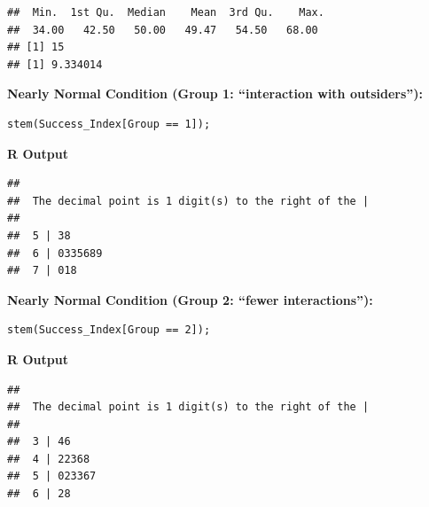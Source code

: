 \begin{example}
\begin{tcolorbox}[colback=gray!10, colframe=black!45, arc=2mm,
  before skip=4pt, after skip=4pt]
\begin{verbatim}
##  Min.  1st Qu.  Median    Mean  3rd Qu.    Max. 
##  34.00   42.50   50.00   49.47   54.50   68.00 
## [1] 15
## [1] 9.334014
\end{verbatim}
\end{tcolorbox}

\vspace{0.5em}
\noindent\textbf{Nearly Normal Condition (Group 1: “interaction with outsiders”):}
\begin{tcolorbox}[colback=gray!10, colframe=black!45, arc=2mm,
  before skip=4pt, after skip=4pt]
\begin{verbatim}
stem(Success_Index[Group == 1]);
\end{verbatim}
\end{tcolorbox}

\noindent\textbf{R Output}
\begin{tcolorbox}[colback=gray!10, colframe=black!45, arc=2mm,
  before skip=4pt, after skip=4pt]
\begin{verbatim}
## 
##  The decimal point is 1 digit(s) to the right of the |
## 
##  5 | 38
##  6 | 0335689
##  7 | 018
\end{verbatim}
\end{tcolorbox}

\vspace{0.5em}
\noindent\textbf{Nearly Normal Condition (Group 2: “fewer interactions”):}
\begin{tcolorbox}[colback=gray!10, colframe=black!45, arc=2mm,
  before skip=4pt, after skip=4pt]
\begin{verbatim}
stem(Success_Index[Group == 2]);
\end{verbatim}
\end{tcolorbox}

\noindent\textbf{R Output}
\begin{tcolorbox}[colback=gray!10, colframe=black!45, arc=2mm,
  before skip=4pt, after skip=4pt]
\begin{verbatim}
## 
##  The decimal point is 1 digit(s) to the right of the |
## 
##  3 | 46
##  4 | 22368
##  5 | 023367
##  6 | 28
\end{verbatim}
\end{tcolorbox}


\end{example}
